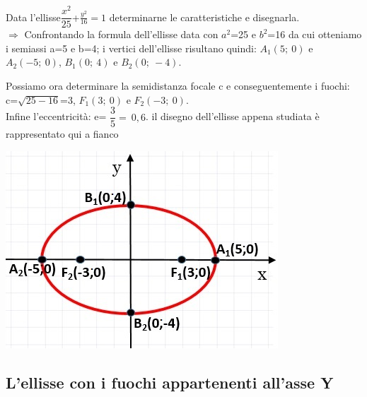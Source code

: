 \begin{esempio}
Data l'ellisse$ \dfrac{x^{2}}{25} $+$ 
\frac{y^{2}}{16}=1 $ determinarne le caratteristiche e disegnarla.\\
$\Rightarrow$ Confrontando la formula dell'ellisse data con $ a^{2} $=25 e 
$ b^{2} $=16 da cui otteniamo i semiassi a=5 e b=4; i vertici dell'ellisse 
risultano quindi:
$ A_{1} (5;~0)$ e $ A_{2} (-5;~0)$,  $ B_{1} (0;~4)$ e $ B_{2} (0;~-4)$. \\
\begin{minipage}{.75\textwidth}
  Possiamo ora determinare la semidistanza focale c e 
conseguentemente i fuochi:\\ c=$ \sqrt{25-16} $=3, \qquad $ F_{1} (3;~0)$ e 
$ F_{2} (-3;~0)$. \\Infine l'eccentricità: e= $ \dfrac{3}{5} =~0,6$.
  il disegno dell'ellisse appena studiata è rappresentato qui a fianco
\end{minipage}
\hspace{0.5cm}
\begin{minipage}{.25\textwidth}
  \includegraphics[width=\textwidth]{img/esempio1.jpg}
\end{minipage}
\end{esempio}

\subsection{L'ellisse con i fuochi appartenenti all'asse Y}

